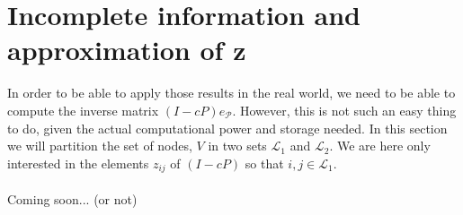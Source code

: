 \documentclass{article}
\newcommand{\1}{\mathbf{1}}
\theoremstyle{definition}
\begin{document}
\section{Incomplete information and approximation of z}
In order to be able to apply those results in the real world, we need to be able to compute the inverse matrix $(I-cP)e_{\mathcal{P}}$. However, this is not such an easy thing to do, given the actual computational power and storage needed. In this section we will partition the set of nodes, $V$ in two sets $\mathcal{L}_1$ and $\mathcal{L}_2$. We are here only interested in the elements $z_{ij}$ of $(I-cP)$ so that $i,j \in \mathcal{L}_1$. \\
\\
Coming soon... (or not)



\end{document}

